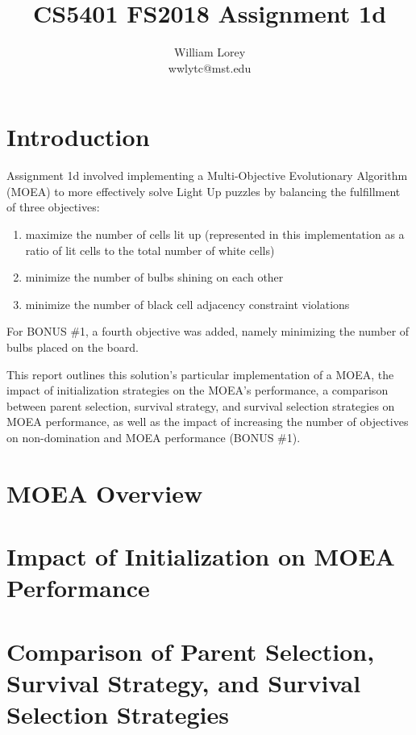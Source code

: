 \documentclass[11pt]{article}
\title{CS5401 FS2018 Assignment 1d}
\author{William  Lorey \\ wwlytc@mst.edu}
\date{}
\begin{document}
\maketitle

\tableofcontents

\section{Introduction}

Assignment 1d involved implementing a Multi-Objective Evolutionary Algorithm (MOEA)
to more effectively solve Light Up puzzles by balancing the fulfillment of three
objectives: 

\begin{enumerate}

\item maximize the number of cells lit up (represented in this implementation
as a ratio of lit cells to the total number of white cells)

\item minimize the number of bulbs shining on each other

\item minimize the number of black cell adjacency constraint violations

\end{enumerate}

For BONUS \#1, a fourth objective was added, namely minimizing the number of bulbs
placed on the board.

This report outlines this solution's particular
implementation of a MOEA, the impact of initialization strategies on the MOEA's 
performance, a comparison between parent selection, survival strategy, and survival
selection strategies on MOEA performance, as well as the impact of increasing the
number of objectives on non-domination and MOEA performance (BONUS \#1).

\section{MOEA Overview}


\section{Impact of Initialization on MOEA Performance}


\section{Comparison of Parent Selection, Survival Strategy, and Survival Selection Strategies}
\end{document}
